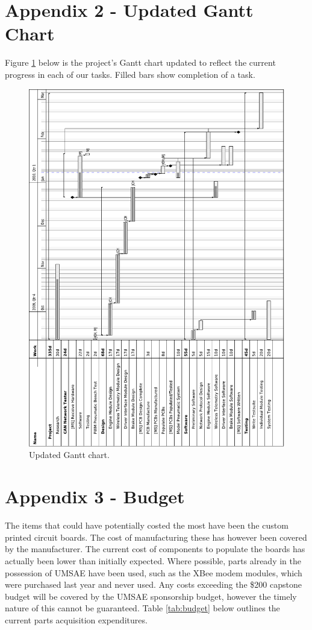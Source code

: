 \documentclass[12pt]{report}
\begin{document}
  \pagebreak

  \section*{Appendix 2 - Updated Gantt Chart}

  Figure \ref{fig:gantt} below is the project's Gantt chart updated to reflect the current progress in each of our tasks. Filled bars show completion of a task.

  \begin{figure}[H]
  \centering{}
    \includegraphics[width=0.75\columnwidth]{gantt_chart.pdf}

  
  \begin{flushleft}
  \caption{Updated Gantt chart.}
  \end{flushleft}

  \label{fig:gantt}
  \end{figure}

  \pagebreak

  \section*{Appendix 3 - Budget}

  The items that could have potentially costed the most have been the custom printed circuit boards. The cost of manufacturing these has however been covered by the manufacturer. The current cost of components to populate the boards has actually been lower than initially expected. Where possible, parts already in the possession of UMSAE have been used, such as the XBee modem modules, which were purchased last year and never used. Any costs exceeding the \$200 capstone budget will be covered by the UMSAE sponsorship budget, however the timely nature of this cannot be guaranteed. Table \ref{tab:budget} below outlines the current parts acquisition expenditures.
\end{document}
